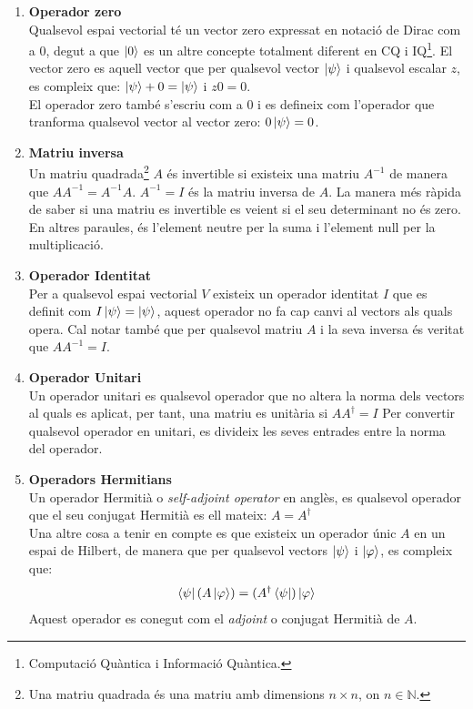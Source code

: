 \begin{enumerate}
	\item \textbf{Operador zero} \\
	Qualsevol espai vectorial té un vector zero expressat en notació de Dirac com a $0$, degut a que $\ket{0}$ es un altre concepte totalment diferent en CQ i IQ\footnote{Computació Quàntica i Informació Quàntica.}. El vector zero es aquell vector que per qualsevol vector $\ket{\psi}$ i qualsevol escalar $z$, es compleix que:	
	$\ket{\psi} + 0 = \ket{\psi} $ i $z0 = 0$. \\
	El operador zero també s'escriu com a $0$ i es defineix com l'operador que tranforma qualsevol vector al vector zero: $0\ket{\psi} = 0 $.  
	
	\item \textbf{Matriu inversa} \\
	Un matriu quadrada\footnote{Una matriu quadrada és una matriu amb dimensions $n\times n$, on $n \in \mathbb{N}$.} $A$ és invertible si existeix una matriu $A^{-1}$ de manera que $AA^{-1}=A^{-1}A$. $A^{-1} = I$ és la matriu inversa de $A$. La manera més ràpida de saber si una matriu es invertible es veient si el seu determinant no és zero. En altres paraules, és l'element neutre per la suma i l'element null per la multiplicació. 

	\item \textbf{Operador Identitat} \\
	Per a qualsevol espai vectorial $V$ existeix un operador identitat $I$ que es definit com $I\ket{\psi} = \ket{\psi}$, aquest operador no fa cap canvi al vectors als quals opera. Cal notar també que per qualsevol matriu $A$ i la seva inversa és veritat que $AA^{-1} = I$. 
	
	\item \textbf{Operador Unitari} \\
	Un operador unitari es qualsevol operador que no altera la norma dels vectors al quals es aplicat, per tant, una matriu es unitària si $AA^\dagger = I$
	Per convertir qualsevol operador en unitari, es divideix les seves entrades entre la norma del operador. 
	
	\item \textbf{Operadors Hermitians} \\
	Un operador Hermitià o \textit{self-adjoint operator} en anglès, es qualsevol operador que el seu conjugat Hermitià es ell mateix: $A = A^\dagger$ \\
	Una altre cosa a tenir en compte es que existeix un operador únic $A$ en un espai de Hilbert, de manera que per qualsevol vectors $\ket{\psi}$ i $\ket{\varphi}$, es compleix que:
	$$
	\bra{\psi} (A \ket{\varphi}) = (A^\dagger\bra{\psi})\ket{\varphi}
	$$ 
	Aquest operador es conegut com el \textit{adjoint} o conjugat Hermitià de $A$.
	
\end{enumerate}

